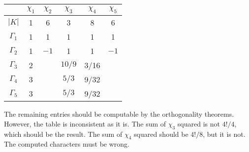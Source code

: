 \documentclass[11pt, english, fleqn, DIV=15, headinclude, BCOR=1cm]{scrartcl}
\begin{document}
\begin{tabular}{c|ccccc}
    & $\chi_1$ & $\chi_2$ & $\chi_3$ & $\chi_4$ & $\chi_5$ \\
    \midrule
    $|K|$ & 1 & 6 & 3 & 8 & 6 \\
    \midrule
    $\Gamma_1$ & 1 & 1 & 1 & 1 & 1 \\
    $\Gamma_2$ & 1 & $-1$ & 1 & 1 & $-1$ \\
    $\Gamma_3$ & 2 & & $10/9$ & 3/16 & \\
    $\Gamma_4$ & 3 & & $5/3$ & 9/32 & \\
    $\Gamma_5$ & 3 & & $5/3$ & 9/32 & \\
\end{tabular}

The remaining entries should be computable by the orthogonality theorems.
However, the table is inconsistent as it is. The sum of $\chi_3$ squared is not
$4!/4$, which should be the result. The sum of $\chi_4$ squared should be
$4!/8$, but it is not. The computed characters must be wrong.
\end{document}

